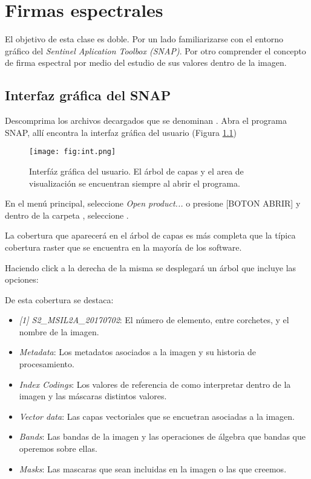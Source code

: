 \chapter{Firmas espectrales}
El objetivo de esta clase es doble. Por un lado familiarizarse con el entorno gráfico del \emph{Sentinel Aplication Toolbox (SNAP)}. Por otro comprender el concepto de firma espectral por medio del estudio de sus valores dentro de la imagen.

\section{Interfaz gráfica del SNAP}

Descomprima los archivos decargados que se denominan . Abra el programa SNAP, allí encontra la interfaz gráfica del usuario (Figura \ref{fig:int})

\begin{figure}[h!]
    \centering
    \texttt{[image: fig:int.png]}
    \caption{Interfáz gráfica del usuario. El árbol de capas y el area de visualización se encuentran siempre al abrir el programa.}
    \label{fig:int}
\end{figure}

En el menú principal, seleccione \emph{Open product...} o presione [BOTON ABRIR] y dentro de la carpeta , seleccione .

La cobertura que aparecerá en el árbol de capas es más completa que la típica cobertura raster que se encuentra en la mayoría de los software.

Haciendo click a la derecha de la misma se desplegará un árbol que incluye las opciones:

De esta cobertura se destaca:

\begin{itemize}
    \item \emph{[1] S2\_MSIL2A\_20170702}: El número de elemento, entre corchetes, y el nombre de la imagen.
    \item \emph{Metadata}: Los metadatos asociados a la imagen y su historia de procesamiento.
    \item \emph{Index Codings}: Los valores de referencia de como interpretar dentro de la imagen y las máscaras distintos valores.
    \item \emph{Vector data}: Las capas vectoriales que se encuetran asociadas a la imagen.
    \item \emph{Bands}: Las bandas de la imagen y las operaciones de álgebra que bandas que operemos sobre ellas.
    \item \emph{Masks}: Las mascaras que sean incluidas en la imagen o las que creemos.
\end{itemize}

